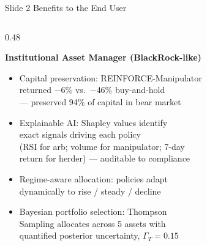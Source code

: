 \documentclass[aspectratio=169, 10pt]{beamer}
\newcommand{\blu}[1]{{\color{accentblue}#1}}
\newcommand{\red}[1]{{\color{cornellred}#1}}
\newcommand{\grn}[1]{{\color{accentgreen}#1}}
\begin{document}
\begin{frame}[t]{Slide 2 \quad Benefits to the End User}
\vspace{2pt}
\begin{columns}[T]

  \begin{column}{0.48\textwidth}
    \begin{block}{\small\textbf{Institutional Asset Manager (BlackRock-like)}}
    \vspace{2pt}
    \begin{itemize}\setlength\itemsep{3pt}\small
      \item \grn{Capital preservation:} REINFORCE-Manipulator\\
            returned \red{$-$6\%} vs.\ \red{$-$46\%} buy-and-hold\\
            --- preserved \blu{94\%} of capital in bear market
      \item \grn{Explainable AI:} Shapley values identify\\
            exact signals driving each policy\\
            (RSI for arb; volume for manipulator; 7-day\\
            return for herder) --- auditable to compliance
      \item \grn{Regime-aware allocation:} policies adapt\\
            dynamically to rise / steady / decline
      \item \grn{Bayesian portfolio selection:} Thompson\\
            Sampling allocates across 5 assets with\\
            quantified posterior uncertainty, $\Gamma_T = 0.15$
    \end{itemize}
    \vspace{2pt}
    \end{block}
  \end{column}


\end{columns}
\end{frame}
\end{document}
